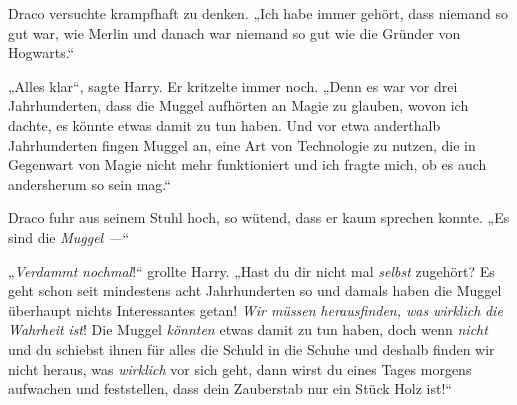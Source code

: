 Draco versuchte krampfhaft zu denken.
„Ich habe immer gehört, dass niemand so gut war, wie Merlin und danach war niemand so gut wie die Gründer von Hogwarts.“

„Alles klar“, sagte Harry. Er kritzelte immer noch.
„Denn es war vor drei Jahrhunderten, dass die Muggel aufhörten an Magie zu glauben, wovon ich dachte, es könnte etwas damit zu tun haben. Und vor etwa anderthalb Jahrhunderten fingen Muggel an, eine Art von Technologie zu nutzen, die in Gegenwart von Magie nicht mehr funktioniert und ich fragte mich, ob es auch andersherum so sein mag.“

Draco fuhr aus seinem Stuhl hoch, so wütend, dass er kaum sprechen konnte.
„Es sind die \emph{Muggel —}“

„\emph{Verdammt} \emph{nochmal}!“ grollte Harry.
„Hast du dir nicht mal \emph{selbst} zugehört? Es geht schon seit mindestens acht Jahrhunderten so und damals haben die Muggel überhaupt nichts Interessantes getan! \emph{Wir müssen} \emph{herausfinden, was} \emph{wirklich} \emph{die} \emph{Wahrheit} \emph{ist}! Die Muggel \emph{könnten} etwas damit zu tun haben, doch wenn \emph{nicht} und du schiebst ihnen für alles die Schuld in die Schuhe und deshalb finden wir nicht heraus, was \emph{wirklich} vor sich geht, dann wirst du eines Tages morgens aufwachen und feststellen, dass dein Zauberstab nur ein Stück Holz ist!“

